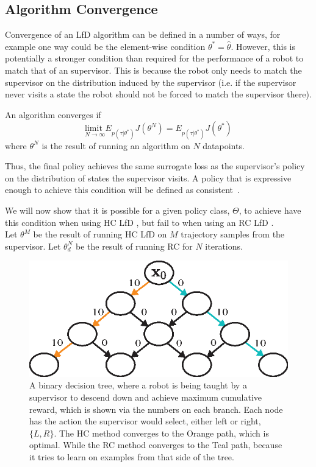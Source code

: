 \documentclass[10pt, conference]{ieeeconf}      %
\newcommand{\ns}{HC LfD }
\newcommand{\nc}{RC LfD }
\begin{document}
\subsection{Algorithm Convergence}
Convergence of an LfD algorithm can be defined in a number of ways, for example one way could be the element-wise condition $\theta^* = \hat{\theta}$. However, this is potentially a stronger condition than required for the performance of a robot to match that of an supervisor.  This is because the robot only needs to match the supervisor on the distribution induced by the supervisor (i.e. if the supervisor never visits a state the robot should not be forced to match the supervisor there). 

An algorithm converges if
$$\underset{N \rightarrow \infty}{\text{limit }} E_{p(\tau|\theta^*)}J(\theta^N)  = E_{p(\tau|\theta^*)}J(\theta^*) $$
\noindent where $\theta^N$ is the result of running an algorithm on $N$ datapoints.

Thus, the final policy achieves the same surrogate loss as the supervisor's policy on the distribution of states the supervisor visits.  A policy that is expressive enough to achieve this condition will be defined as consistent~\cite{vapnik1992principles}.

We will now show that it is possible for a given policy class, $\Theta$, to achieve have this condition when using \ns , but fail to when using an \nc. \\
Let $\theta^M$ be the result of running \ns on $M$ trajectory samples from the supervisor.
Let $\theta_{d}^N$ be the result of running RC for $N$ iterations.

\begin{figure}
\centering
\includegraphics{f_figs/counter_exmp.eps}
\caption{
    \footnotesize
A binary decision tree, where a robot is being taught by a supervisor to descend down and achieve maximum cumulative reward, which is shown via the numbers on each branch. Each node has the action the supervisor would select, either left or right, $\lbrace L, R \rbrace$. The HC method converges to the Orange path, which is optimal. While the RC method converges to the Teal path, because it tries to learn on examples from that side of the tree.}
\vspace*{-20pt}
\label{fig:c_ex}
\end{figure}
\end{document}
